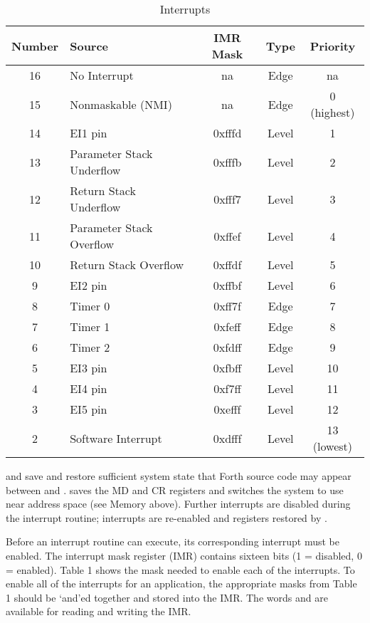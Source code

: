 \begin{table*}
\caption{Interrupts}
\begin{center}
\begin{tabular}{|c|l|c|c|c|}
\hline
Number & Source &			IMR Mask &	Type &	Priority  \\
\hline \hline
16 &	No Interrupt &			na &		Edge &	na  \\
\hline
15 &	Nonmaskable (NMI) &		na &		Edge &	0 (highest)  \\
\hline
14 &	EI1 pin &			0xfffd &	Level &	1  \\
\hline
13 &	Parameter Stack Underflow &	0xfffb &	Level &	2  \\
\hline
12 &	Return Stack Underflow &	0xfff7 &	Level &	3  \\
\hline
11 &	Parameter Stack Overflow &	0xffef &	Level &	4  \\
\hline
10 &	Return Stack Overflow &		0xffdf &	Level &	5  \\
\hline
 9 &	EI2 pin &			0xffbf &	Level &	6  \\
\hline
 8 &	Timer 0 &			0xff7f &	Edge &	7  \\
\hline
 7 &	Timer 1 &			0xfeff &	Edge &	8  \\
\hline
 6 &	Timer 2 &			0xfdff &	Edge &	9  \\
\hline
 5 &	EI3 pin &			0xfbff &	Level &	10  \\
\hline
 4 &	EI4 pin &			0xf7ff &	Level &	11  \\
\hline
 3 &	EI5 pin &			0xefff &	Level &	12  \\
\hline
 2 &	Software Interrupt &		0xdfff &	Level &	13 (lowest)  \\
\hline
\end{tabular}
\end{center}
\end{table*}  


 and  save and restore sufficient system state that
Forth source code may appear between  and .
 saves the MD and CR registers and
switches the system to use near address space (see
Memory above).
Further interrupts are disabled during the interrupt routine; interrupts
are re-enabled and registers restored by .

Before an interrupt routine can execute, its corresponding interrupt
must be enabled.  The interrupt mask register (IMR) contains sixteen
bits (1 = disabled, 0 = enabled).  Table 1 shows the mask needed to
enable each of the interrupts.  To enable all of the interrupts
for an application, the appropriate masks from Table 1 should be
`and'ed together and stored into the IMR.
The words  and  are available for
reading and writing the IMR.

